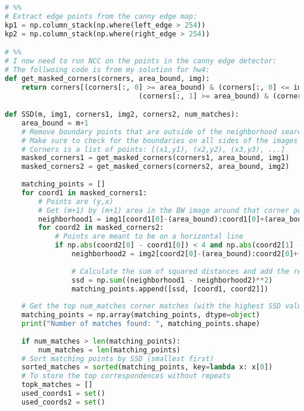 \documentclass{article}
\begin{document}
\begin{lstlisting}[language=Python]
# %%
# Extract edge points from the canny edge map:
kp1 = np.column_stack(np.where(left_edge > 254))
kp2 = np.column_stack(np.where(right_edge > 254))

# %%
# I now need to run NCC on the points in the canny edge detector:
# The follwoing code is from my solution for hw4:
def get_masked_corners(corners, area_bound, img):
    return corners[(corners[:, 0] >= area_bound) & (corners[:, 0] <= img.shape[0] - area_bound) &
                                (corners[:, 1] >= area_bound) & (corners[:, 1] <= img.shape[1] - area_bound)]

def SSD(m, img1, corners1, img2, corners2, num_matches):
    area_bound = m+1
    # Remove boundary points that are outside of the neighborhood search area
    # Make sure to check for the boundaries on all sides of the images
    # Corners is a list of points: [(x1,y1), (x2,y2), (x3,y3), ...]
    masked_corners1 = get_masked_corners(corners1, area_bound, img1)
    masked_corners2 = get_masked_corners(corners2, area_bound, img2)
    
    matching_points = []
    for coord1 in masked_corners1:
        # Points are (y,x)
        # Get (m+1) by (m+1) area in the BW image around that corner point
        neighborhood1 = img1[coord1[0]-(area_bound):coord1[0]+(area_bound), coord1[1]-(area_bound):coord1[1]+(area_bound)]
        for coord2 in masked_corners2:
            # Points are meant to be on a horizontal line
            if np.abs(coord2[0] - coord1[0]) < 4 and np.abs(coord2[1] - coord1[1] < 10):
                neighborhood2 = img2[coord2[0]-(area_bound):coord2[0]+(area_bound), coord2[1]-(area_bound):coord2[1]+(area_bound)]
                
                # Calculate the sum of squared distances and add the result to a list to later get the topk
                ssd = np.sum((neighborhood1 - neighborhood2)**2)
                matching_points.append([ssd, [coord1, coord2]])
            
    # Get the top num_matches corner matches (with the highest SSD values first)# Convert to array for easier manipulation
    matching_points = np.array(matching_points, dtype=object)
    print("Number of matches found: ", matching_points.shape)
    
    if num_matches > len(matching_points):
        num_matches = len(matching_points)
    # Sort matching points by SSD (smallest first)
    sorted_matches = sorted(matching_points, key=lambda x: x[0])
    # To store the top correspondences without repeats
    topk_matches = []
    used_coords1 = set()
    used_coords2 = set()
    

\end{lstlisting}
\end{document}
